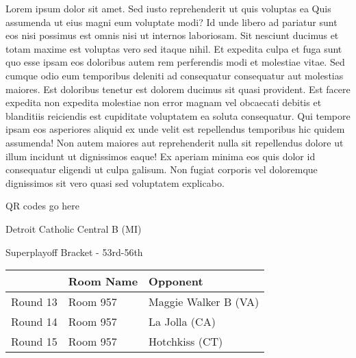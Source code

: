 \documentclass{article}%
\begin{document}
\vspace*{8pt}%
\linebreak%
\newline%
\newline%
Lorem ipsum dolor sit amet. Sed iusto reprehenderit ut quis voluptas ea Quis assumenda ut eius magni eum voluptate modi? Id unde libero ad pariatur sunt eos nisi possimus est omnis nisi ut internos laboriosam. Sit nesciunt ducimus et totam maxime est voluptas vero sed itaque nihil. Et expedita culpa et fuga sunt quo esse ipsam eos doloribus autem rem perferendis modi et molestiae vitae.\newline%
\newline%
Sed cumque odio eum temporibus deleniti ad consequatur consequatur aut molestias maiores. Est doloribus tenetur est dolorem ducimus sit quasi provident. Est facere expedita non expedita molestiae non error magnam vel obcaecati debitis et blanditiis reiciendis est cupiditate voluptatem ea soluta consequatur. Qui tempore ipsam eos asperiores aliquid ex unde velit est repellendus temporibus hic quidem assumenda!\newline%
\newline%
Non autem maiores aut reprehenderit nulla sit repellendus dolore ut illum incidunt ut dignissimos eaque! Ex aperiam minima eos quis dolor id consequatur eligendi ut culpa galisum. Non fugiat corporis vel doloremque dignissimos sit vero quasi sed voluptatem explicabo.\newline%
\newline%
%
\vspace*{30pt}%
\begin{center}%
\begin{Huge}%
QR codes go here%
\end{Huge}%
\end{center}%
\newpage%
\begin{center}%
\begin{Huge}%
Detroit Catholic Central B (MI)%
\end{Huge}%
\vspace*{8pt}%
\linebreak%
\begin{Large}%
Superplayoff Bracket {-} 53rd{-}56th%
\end{Large}%
\end{center}%
%
\begin{tabularx}{\textwidth}{|c|Y|Y|}%
\hline%
&Room Name&Opponent\\%
\hline%
Round 13&Room 957&Maggie Walker B (VA)\\%
Round 14&Room 957&La Jolla (CA)\\%
Round 15&Room 957&Hotchkiss (CT)\\%
\hline%
\end{tabularx}%
\end{document}
